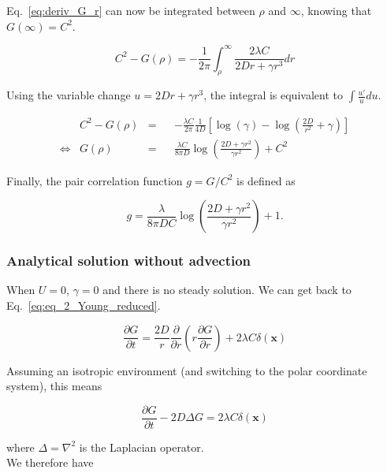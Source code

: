 Eq.~\ref{eq:deriv_G_r} can now be integrated between $\rho$ and $\infty$, knowing that $G(\infty)=C^{2}.$

\begin{equation}
 C^{2}-G(\rho) = -\frac{1}{2\pi}{\displaystyle \int_{\rho}^{\infty}}\frac{2\lambda C}{2Dr+\gamma r^{3}}dr\label{eq:deriv_G_r_int1}
\end{equation}

Using the variable change $u=2Dr+\gamma r^{3}$, the integral is equivalent
to $\int\frac{u'}{u}du$.

\begin{align}
 & C^{2}-G(\rho) & = & & -\frac{\lambda C}{2\pi}\frac{1}{4D}[\log(\gamma)-\log(\frac{2D}{r^{2}}+\gamma)]\label{eq:deriv_G_rint2}\\
\Leftrightarrow & G(\rho) & = & & \frac{\lambda C}{8\pi D}\log\left(\frac{2D+\gamma r^{2}}{\gamma r^{2}}\right)+C^{2}\label{eq:G_rho}
\end{align}

Finally, the pair correlation function $g=G/C^{2}$ is defined as

\begin{equation}
g=\frac{\lambda}{8\pi DC}\log\left(\frac{2D+\gamma r^{2}}{\gamma r^{2}}\right)+1.
\end{equation}


\subsubsection*{Analytical solution without advection}

When $U=0$, $\gamma=0$ and there is no steady solution. We can get
back to Eq.~\ref{eq:eq_2_Young_reduced}.

\begin{equation}
\frac{\partial G}{\partial t}=\frac{2D}{r}\frac{\partial}{\partial r}\left(r\frac{\partial G}{\partial r}\right)+2\lambda C\delta(\boldsymbol{x})\label{eq:g_without_advection}
\end{equation}

Assuming an isotropic environment (and switching to the polar coordinate system), this means

\begin{equation}
\frac{\partial G}{\partial t}-2D\Delta G=2\lambda C\delta(\boldsymbol{x})
\end{equation}

where $\Delta=\nabla^{2}$ is the Laplacian operator. \\

We therefore have 

